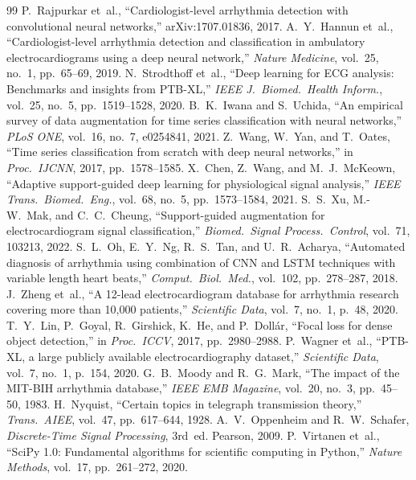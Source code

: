 \documentclass[conference]{IEEEtran}
\begin{document}

\begin{thebibliography}{99}
 P.~Rajpurkar et~al., ``Cardiologist-level
arrhythmia detection with convolutional neural networks,'' arXiv:1707.01836, 2017.
 A.~Y.~Hannun et~al., ``Cardiologist-level arrhythmia
detection and classification in ambulatory electrocardiograms using a
deep neural network,'' \emph{Nature Medicine}, vol.~25, no.~1, pp.~65--69, 2019.
 N.~Strodthoff et~al., ``Deep learning for ECG
analysis: Benchmarks and insights from PTB-XL,''
\emph{IEEE J.~Biomed.~Health Inform.}, vol.~25, no.~5, pp.~1519--1528, 2020.
 B.~K.~Iwana and S.~Uchida, ``An empirical survey of
data augmentation for time series classification with neural networks,''
\emph{PLoS ONE}, vol.~16, no.~7, e0254841, 2021.
 Z.~Wang, W.~Yan, and T.~Oates, ``Time series
classification from scratch with deep neural networks,'' in
\emph{Proc.~IJCNN}, 2017, pp.~1578--1585.
 X.~Chen, Z.~Wang, and M.~J.~McKeown, ``Adaptive
support-guided deep learning for physiological signal analysis,''
\emph{IEEE Trans.~Biomed.~Eng.}, vol.~68, no.~5, pp.~1573--1584, 2021.
 S.~S.~Xu, M.-W.~Mak, and C.~C.~Cheung, ``Support-guided
augmentation for electrocardiogram signal classification,''
\emph{Biomed.~Signal Process.~Control}, vol.~71, 103213, 2022.
 S.~L.~Oh, E.~Y.~Ng, R.~S.~Tan, and U.~R.~Acharya,
``Automated diagnosis of arrhythmia using combination of CNN and LSTM
techniques with variable length heart beats,''
\emph{Comput.~Biol.~Med.}, vol.~102, pp.~278--287, 2018.
 J.~Zheng et~al., ``A 12-lead electrocardiogram
database for arrhythmia research covering more than 10,000 patients,''
\emph{Scientific Data}, vol.~7, no.~1, p.~48, 2020.
 T.~Y.~Lin, P.~Goyal, R.~Girshick, K.~He, and
P.~Doll\'ar, ``Focal loss for dense object detection,'' in
\emph{Proc.~ICCV}, 2017, pp.~2980--2988.
 P.~Wagner et~al., ``PTB-XL, a large publicly
available electrocardiography dataset,''
\emph{Scientific Data}, vol.~7, no.~1, p.~154, 2020.
 G.~B.~Moody and R.~G.~Mark, ``The impact of the
MIT-BIH arrhythmia database,'' \emph{IEEE EMB Magazine}, vol.~20, no.~3,
pp.~45--50, 1983.
 H.~Nyquist, ``Certain topics in telegraph
transmission theory,'' \emph{Trans.~AIEE}, vol.~47, pp.~617--644, 1928.
 A.~V.~Oppenheim and R.~W.~Schafer,
\emph{Discrete-Time Signal Processing}, 3rd~ed. Pearson, 2009.
 P.~Virtanen et~al., ``SciPy 1.0: Fundamental
algorithms for scientific computing in Python,''
\emph{Nature Methods}, vol.~17, pp.~261--272, 2020.
\end{thebibliography}
\end{document}

